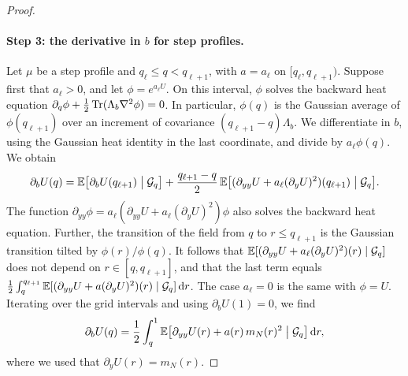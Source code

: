 \begin{proof}
\paragraph{Step 3: the derivative in $b$ for step profiles.}
Let $\mu$ be a step profile and $q_\ell\le q<q_{\ell+1}$, with $a=a_\ell$
on $[q_\ell,q_{\ell+1})$. Suppose first that $a_\ell>0$, and let
$\phi=e^{a_\ell U}$. On this interval, $\phi$ solves the backward heat
equation $\partial_q\phi+\frac12\operatorname{Tr}(\Lambda_b\nabla^2\phi)=0$. In particular,
$\phi(q)$ is the Gaussian average of $\phi(q_{\ell+1})$ over an increment
of covariance $(q_{\ell+1}-q)\Lambda_b$. We differentiate in $b$, using
the Gaussian heat identity in the last coordinate, and divide by
$a_\ell\phi(q)$. We obtain
\[
 \partial_bU(q)=\mathbb E\bigl[\partial_bU(q_{\ell+1})\bigm|\mathcal G_q\bigr]
  +\frac{q_{\ell+1}-q}2\,
  \mathbb E\bigl[(\partial_{yy}U+a_\ell(\partial_yU)^2)(q_{\ell+1})\bigm|\mathcal G_q\bigr].
\]
The function
$\partial_{yy}\phi=a_\ell(\partial_{yy}U+a_\ell(\partial_yU)^2)\phi$ also
solves the backward heat equation. Further, the transition of the field
from $q$ to $r\le q_{\ell+1}$ is the Gaussian transition tilted by
$\phi(r)/\phi(q)$. It follows that
$\mathbb E[(\partial_{yy}U+a_\ell(\partial_yU)^2)(r)\mid\mathcal G_q]$ does not
depend on $r\in[q,q_{\ell+1}]$, and that the last term equals
$\frac12\int_q^{q_{\ell+1}}\mathbb E[(\partial_{yy}U+a(\partial_yU)^2)(r)\mid\mathcal G_q]\,\mathrm d r$.
The case $a_\ell=0$ is the same with $\phi=U$. Iterating over the grid
intervals and using $\partial_bU(1)=0$, we find
\begin{equation}\label{eq:tree-b-response}
 \partial_bU(q)=\frac12\int_q^1
   \mathbb E\bigl[\partial_{yy}U(r)+a(r)\,m_N(r)^2\bigm|\mathcal G_q\bigr]\,\mathrm d r,
\end{equation}
where we used that $\partial_yU(r)=m_N(r)$.


\end{proof}
